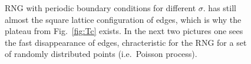         \begin{figure}[htb]
            \centering

            \caption[Examples of RNG for different $\sigma$]
            {
                RNG with periodic boundary conditions for different \(\sigma\).
                 has still almost the square lattice
                configuration of edges, which is why the plateau from Fig.\ \ref{fig:Tc}
                exists. In the next two pictures one sees the fast disappearance
                of edges, chracteristic for the RNG for a set of randomly
                distributed points (i.e.\ Poisson process).
            }
            \label{fig:RNG_sigma}
        \end{figure}
        \clearpage

